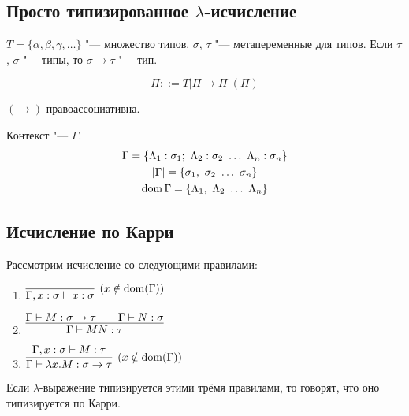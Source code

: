 \subsection*{\texorpdfstring{Просто типизированное $\lambda$-исчисление}{Simply typed lambda calculus}}

\begin{definition}[тип]
    $T = \{\alpha, \beta, \gamma, \ldots\}$ "--- множество типов.
    $\sigma$, $\tau$ "--- метапеременные для типов.
    Если $\tau$, $\sigma$ "--- типы, то $\sigma \rightarrow \tau$ "--- тип.
    \begin{bnf}
    \[
        \Pi ::= T | \Pi \rightarrow \Pi | (\Pi)
    \]
    \end{bnf}
    $\left(\rightarrow\right)$ правоассоциативна.
\end{definition}

\begin{definition}[контекст] Контекст "--- $\Gamma$.
\begin{gather*}
    \Gamma = \{ \Lambda_{1} : \sigma_{1};\ \Lambda_{2} : \sigma_{2}\ \ldots\ \Lambda_{n} : \sigma_{n} \} \\
    \abs{\Gamma} = \{ \sigma_{1},\ \sigma_{2}\ \ldots\ \sigma_{n} \} \\
    \dom \Gamma = \{ \Lambda_{1},\ \Lambda_{2}\ \ldots\ \Lambda_{n} \}
\end{gather*}
\end{definition}

\subsection{\texorpdfstring{Исчисление по Карри}{Curry-style}}

\begin{definition}
    Рассмотрим исчисление со следующими правилами:
    \begin{enumerate}
        \item $\infer[(x \notin \dom(\Gamma))]
            {\Gamma, x:\sigma \vdash x:\sigma}
            {}$
        \item $\infer[]
            {\Gamma \vdash M N : \tau}
            {\Gamma \vdash M:\sigma \rightarrow \tau && \Gamma \vdash N:\sigma}$
        \item $\infer[(x \notin \dom(\Gamma))]
            {\Gamma \vdash \lambda x . M : \sigma \rightarrow \tau}
            {\Gamma, x : \sigma \vdash M : \tau}$
    \end{enumerate}
    Если $\lambda$-выражение типизируется этими трёмя правилами, то говорят, что оно типизируется по Карри.
\end{definition}

